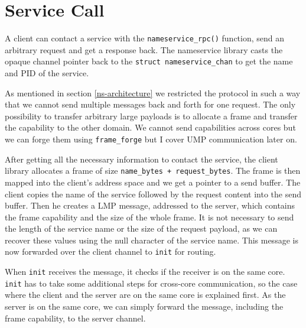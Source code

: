 \section{Service Call}
\label{ns-service-call}

A client can contact a service with the \verb|nameservice_rpc()| function, send an arbitrary request and get a response back. The nameservice
library casts the opaque channel pointer back to the \verb|struct nameservice_chan| to get the name and PID of the service. 

As mentioned in section \ref{ns-architecture} we restricted the protocol in such a way that we cannot send multiple messages back and forth 
for one request. The only possibility to transfer arbitrary large payloads is to allocate a frame and transfer the capability to the other 
domain. We cannot send capabilities across cores but we can forge them using \verb|frame_forge| but I cover UMP communication later on.

After getting all the necessary information to contact the service, the client library allocates a frame of size 
\verb|name_bytes + request_bytes|. The frame is then mapped into the client's address space and we get a pointer to a send buffer. The client
copies the name of the service followed by the request content into the send buffer. Then he creates a LMP message, addressed to the server,
which contains the frame capability and the size of the whole frame. It is not necessary to send the length of the service name or the size
of the request payload, as we can recover these values using the null character of the service name. This message is now forwarded over the
client channel to \verb|init| for routing.

When \verb|init| receives the message, it checks if the receiver is on the same core. \verb|init| has to take some additional steps for 
cross-core communication, so the case where the client and the server are on the same core is explained first. As the server is on the same
core, we can simply forward the message, including the frame capability, to the server channel.

